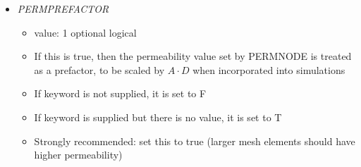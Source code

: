 \documentclass[12pt]{article}
\newcommand{\comment}[1]{{\color{red} \it [#1]}}
\begin{document}
\begin{itemize}
\begin{itemize}
\end{itemize}

\item {\it PERMPREFACTOR}
\begin{itemize}
	\item  value: 1 optional logical
	\item If this is true, then the permeability value set by PERMNODE is treated as a prefactor, to be scaled by $A\cdot D$ when incorporated into simulations
	\item If keyword is not supplied, it is set to F 
	\item If keyword is supplied but there is no value, it is set to T
	\item {\color{red} Strongly recommended: set this to true} (larger mesh elements should have higher permeability)
\end{itemize}
%

\end{itemize}
\end{document}
